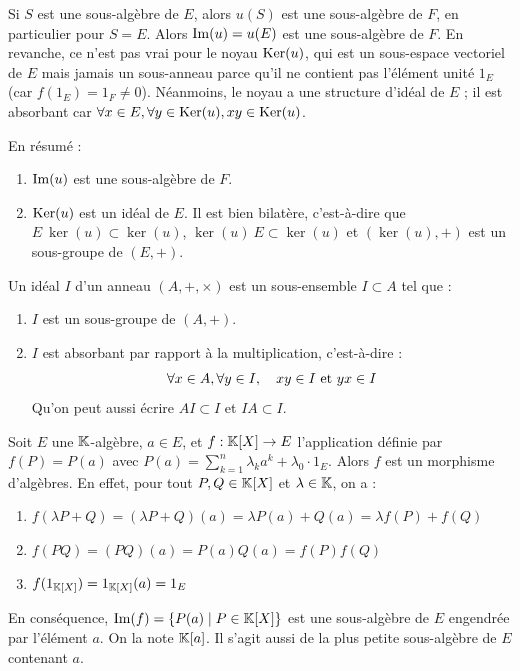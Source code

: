 \documentclass[11pt,a4paper]{report}
\begin{document}
\begin{remark}
    Si $S$ est une sous-algèbre de $E$, alors $u(S)$ est une sous-algèbre de $F$, en particulier pour $S = E$. Alors $\mathrm{Im}(u) = u(E)$ est une sous-algèbre de $F$. En revanche, ce n'est pas vrai pour le noyau $\mathrm{Ker}(u)$, qui est un sous-espace vectoriel de $E$ mais jamais un sous-anneau parce qu'il ne contient pas l'élément unité $1_E$ (car $f(1_E) = 1_F \neq 0$). Néanmoins, le noyau a une structure d'idéal de $E$ ; il est absorbant car $\forall x \in E, \forall y \in \mathrm{Ker}(u), xy \in \mathrm{Ker}(u)$.

    En résumé :
    \begin{enumerate}
        \item $\mathrm{Im}(u)$ est une sous-algèbre de $F$.
        \item $\mathrm{Ker}(u)$ est un idéal de $E$. Il est bien bilatère, c'est-à-dire que $E~\ker(u) \subset \ker(u)$, $\ker(u)~E \subset \ker(u)$ et $(\ker(u),+)$ est un sous-groupe de $(E,+)$.
    \end{enumerate}
\end{remark}

\begin{rappel}
    Un idéal $I$ d'un anneau $(A,+,\times)$ est un sous-ensemble $I \subset A$ tel que :
    \begin{enumerate}
        \item $I$ est un sous-groupe de $(A,+)$.
        \item $I$ est absorbant par rapport à la multiplication, c'est-à-dire :
        $$
            \forall x \in A, \forall y \in I, \quad xy \in I \text{ et } yx \in I
        $$
        Qu'on peut aussi écrire $AI \subset I$ et $IA \subset I$.
    \end{enumerate}
\end{rappel}

\begin{example}
    Soit $E$ une $\mathbb{K}$-algèbre, $a \in E$, et $f : \mathbb{K}[X] \to E$ l'application définie par $f(P) = P(a)$ avec $P(a) = \sum_{k=1}^n \lambda_k a^k + \lambda_0 \cdot 1_E$. Alors $f$ est un morphisme d'algèbres. En effet, pour tout $P,Q \in \mathbb{K}[X]$ et $\lambda \in \mathbb{K}$, on a :
    \begin{enumerate}
        \item $f(\lambda P + Q) = (\lambda P + Q)(a) = \lambda P(a) + Q(a) = \lambda f(P) + f(Q)$
        \item $f(PQ) = (PQ)(a) = P(a)Q(a) = f(P)f(Q)$
        \item $f(1_{\mathbb{K}[X]}) = 1_{\mathbb{K}[X]}(a) = 1_E$
    \end{enumerate}
    En conséquence, $\mathrm{Im}(f) = \{P(a) \mid P \in \mathbb{K}[X]\}$ est une sous-algèbre de $E$ engendrée par l'élément $a$. On la note $\mathbb{K}[a]$. Il s'agit aussi de la plus petite sous-algèbre de $E$ contenant $a$.
\end{example}
\end{document}
